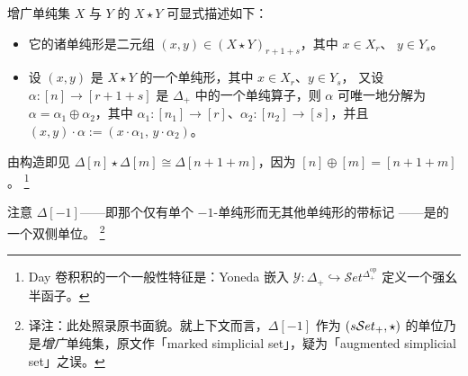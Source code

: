 \begin{definition}\label{def:join-augmented-simplicial-sets}
增广单纯集 $X$ 与 $Y$ 的\textbf{\trJoin} $X\star Y$ 可显式描述如下：
\begin{itemize}
\item 它的诸单纯形是二元组 $(x,y)\in(X\star Y)_{r+1+s}$，其中 $x\in X_{r}$、%
$y\in Y_{s}$。
\item 设 $(x,y)$ 是 $X\star Y$ 的一个单纯形，其中 $x\in X_{r}$、$y\in Y_{s}$，%
又设 $\alpha\colon[n]\to[r+1+s]$ 是 $\Delta_{+}$ 中的一个单纯算子，则 $\alpha$%
可唯一地分解为 $\alpha=\alpha_{1}\oplus\alpha_{2}$，其中%
$\alpha_{1}\colon[n_{1}]\to[r]$、$\alpha_{2}\colon[n_{2}]\to[s]$，并且%
$(x,y)\cdot\alpha:=(x\cdot\alpha_{1},\,y\cdot\alpha_{2})$。
\end{itemize}
\end{definition}

由构造即见 $\Delta[n]\star\Delta[m]\cong\Delta[n+1+m]$，因为%
$[n]\oplus[m]=[n+1+m]$。%
\footnote{Day 卷积积的一个一般性特征是：Yoneda 嵌入%
$\mathcal{Y}\colon\Delta_{+}\hookrightarrow\mathcal{S}et^{\Delta_{+}^{\mathrm{op}}}$%
定义一个强幺半函子。}

注意 $\Delta[-1]$——即那个仅有单个 $-1$-单纯形而无其他单纯形的带标记%
\trSimplicialSet——是\trJoin\trBifunctor{}的一个双侧单位。
\footnote{译注：此处照录原书面貌。就上下文而言，$\Delta[-1]$ 作为%
$(s\mathcal{S}et_{+},\star)$ 的单位乃是\emph{增广}单纯集，原文作「marked simplicial
set」，疑为「augmented simplicial set」之误。}

